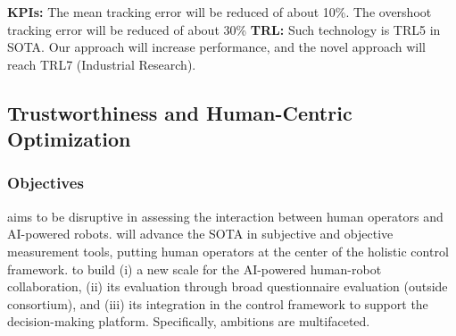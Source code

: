 \textbf{KPIs:} The mean tracking error will be reduced of about 10\%.
The overshoot tracking error will be reduced of about 30\%
\textbf{\textbar{} TRL:} Such technology is TRL5 in SOTA. Our approach
will increase performance, and the novel approach will reach TRL7
(Industrial Research).

\subsection{Trustworthiness and Human-Centric
Optimization}\label{trustworthiness-and-human-centric-optimization}

\subsubsection{\texorpdfstring{Objectives
}{Objectives }}\label{objectives-3}

 aims to be disruptive in assessing the interaction
between human operators and AI-powered robots.  will
advance the SOTA in subjective and objective measurement tools, putting
human operators at the center of the holistic control framework.
 to build (i) a new scale for the AI-powered
human-robot collaboration, (ii) its evaluation through broad
questionnaire evaluation (outside consortium), and (iii) its integration
in the control framework to support the decision-making platform.
Specifically,  ambitions are
multifaceted.

